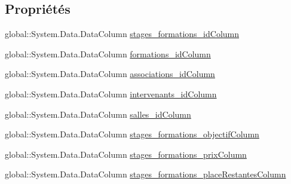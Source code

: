 \subsection*{Propriétés}
\begin{DoxyCompactItemize}
\item 
global\+::\+System.\+Data.\+Data\+Column \hyperlink{classforma_1_1formadb_data_set_1_1stages__formations_data_table_a387b6a19551837b950b28d18ba7c03c9}{stages\+\_\+formations\+\_\+id\+Column}
\item 
global\+::\+System.\+Data.\+Data\+Column \hyperlink{classforma_1_1formadb_data_set_1_1stages__formations_data_table_a92d32d130703fcdbcdfd722a7292380d}{formations\+\_\+id\+Column}
\item 
global\+::\+System.\+Data.\+Data\+Column \hyperlink{classforma_1_1formadb_data_set_1_1stages__formations_data_table_ace5629f5a977d079be611c2d9595ffd5}{associations\+\_\+id\+Column}
\item 
global\+::\+System.\+Data.\+Data\+Column \hyperlink{classforma_1_1formadb_data_set_1_1stages__formations_data_table_ac56cef4189721d00d50a7a8cebf92798}{intervenants\+\_\+id\+Column}
\item 
global\+::\+System.\+Data.\+Data\+Column \hyperlink{classforma_1_1formadb_data_set_1_1stages__formations_data_table_af726c5bbd8ec8620516763d4adc1fdf9}{salles\+\_\+id\+Column}
\item 
global\+::\+System.\+Data.\+Data\+Column \hyperlink{classforma_1_1formadb_data_set_1_1stages__formations_data_table_ad277c325f74e2af953f7fe602124c7a6}{stages\+\_\+formations\+\_\+objectif\+Column}
\item 
global\+::\+System.\+Data.\+Data\+Column \hyperlink{classforma_1_1formadb_data_set_1_1stages__formations_data_table_a9c94b00f6816317a6dd6e6237107aaf2}{stages\+\_\+formations\+\_\+prix\+Column}
\item 
global\+::\+System.\+Data.\+Data\+Column \hyperlink{classforma_1_1formadb_data_set_1_1stages__formations_data_table_ad47d6b93b612e666d6e763a8a00b0c77}{stages\+\_\+formations\+\_\+place\+Restantes\+Column}

\end{DoxyCompactItemize}
